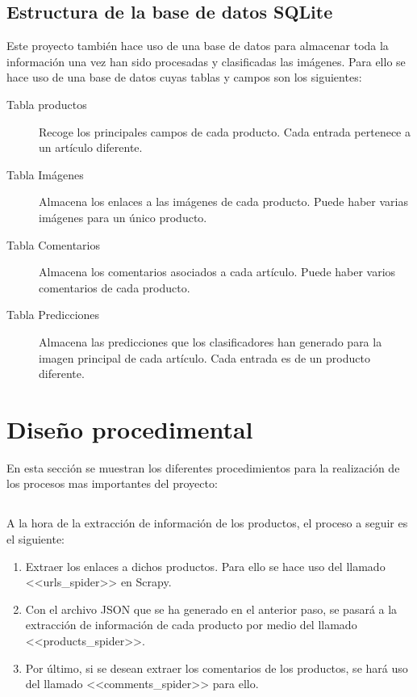\subsection{Estructura de la base de datos SQLite}

Este proyecto también hace uso de una base de datos para almacenar toda la información una vez han sido procesadas y clasificadas las imágenes.
Para ello se hace uso de una base de datos cuyas tablas y campos son los siguientes:


\begin{description}
    \item[Tabla productos] Recoge los principales campos de cada producto. Cada entrada pertenece a un artículo diferente.
    \item[Tabla Imágenes] Almacena los enlaces a las imágenes de cada producto. Puede haber varias imágenes para un único producto.
    \item[Tabla Comentarios] Almacena los comentarios asociados a cada artículo. Puede haber varios comentarios de cada producto.
    \item[Tabla Predicciones] Almacena las predicciones que los clasificadores han generado para la imagen principal de cada artículo. Cada entrada es de un producto diferente.
\end{description}

\section{Diseño procedimental}
En esta sección se muestran los diferentes procedimientos para la realización de los procesos mas importantes del proyecto:


\subsection{}

A la hora de la extracción de información de los productos, el proceso a seguir es el siguiente:

\begin{enumerate}
    \item Extraer los enlaces a dichos productos. Para ello se hace uso del  llamado <<urls\_spider>> en Scrapy.
    \item Con el archivo JSON que se ha generado en el anterior paso, se pasará a la extracción de información de cada producto por medio del  llamado <<products\_spider>>.
    \item Por último, si se desean extraer los comentarios de los productos, se hará uso del  llamado <<comments\_spider>> para ello.
\end{enumerate}

